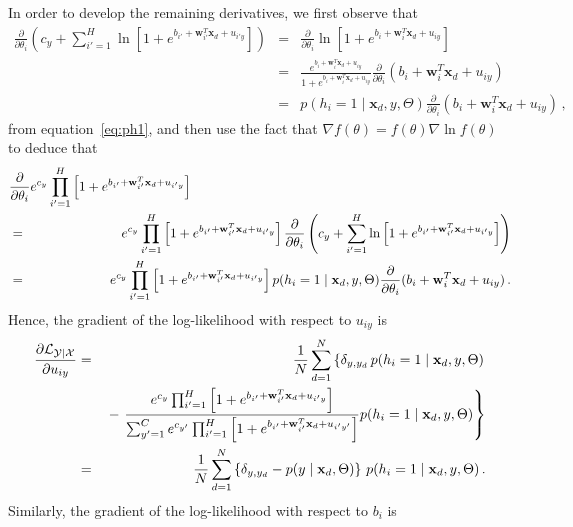\documentclass[a4paper]{article}
\renewcommand{\v}[1]{\mathbf{#1}}
\renewcommand{\c}[1]{{\cal #1}}
\begin{document}
In order to develop the remaining derivatives, we first observe that
\begin{eqnarray}
\frac{\partial}{\partial\theta_i}\left(
c_{y}+\sum_{i'=1}^{H}\ln\left[1+e^{b_{i'}+ \v{w}_{i'}^T\v{x}_d+u_{i'y}}\right]
\right)
&=&
\frac{\partial}{\partial\theta_i}\ln\left[1+e^{b_{i}+ \v{w}_{i}^T\v{x}_d+u_{iy}}\right]
\nonumber\\&=&
\frac{e^{b_{i}+ \v{w}_{i}^T\v{x}_d+u_{iy}}}
{1+e^{b_{i}+ \v{w}_{i}^T\v{x}_d+u_{iy}}}
\frac{\partial}{\partial\theta_i}(b_{i}+ \v{w}_{i}^T\v{x}_d+u_{iy})
\nonumber\\&=&
p(h_i=1\;|\;\v{x}_d,y,\Theta)
\frac{\partial}{\partial\theta_i}(b_{i}+ \v{w}_{i}^T\v{x}_d+u_{iy})\,,
\end{eqnarray}
from equation~\eqref{eq:ph1},
and then use the fact that 
$\nabla f(\theta)=f(\theta)\nabla\ln f(\theta)$ to deduce that
\begin{eqnarray}
&\frac{\partial}{\partial\theta_i}e^{c_{y}}\prod_{i'=1}^{H}\left[1+e^{b_{i'}+ \v{w}_{i'}^T\v{x}_d+u_{i'y}}\right]&
\nonumber\\&=&\hspace*{-25mm}
e^{c_{y}}\prod_{i'=1}^{H}\left[1+e^{b_{i'}+ \v{w}_{i'}^T\v{x}_d+u_{i'y}}\right]
\frac{\partial}{\partial\theta_i}\left(
c_{y}+\sum_{i'=1}^{H}\ln\left[1+e^{b_{i'}+ \v{w}_{i'}^T\v{x}_d+u_{i'y}}\right]
\right)
\nonumber\\&=&\hspace*{-25mm}
e^{c_{y}}\prod_{i'=1}^{H}\left[1+e^{b_{i'}+ \v{w}_{i'}^T\v{x}_d+u_{i'y}}\right]
p(h_i=1\;|\;\v{x}_d,y,\Theta)
\frac{\partial}{\partial\theta_i}(b_{i}+ \v{w}_{i}^T\v{x}_d+u_{iy})\,.
\end{eqnarray}
Hence, the gradient of the log-likelihood with respect to $u_{iy}$ is
\begin{eqnarray}
\frac{\partial\c{L}_{\c{Y}|\c{X}}}{\partial u_{iy}}
& = & 
\frac{1}{N}\sum_{d=1}^N\left\{
\delta_{y,y_d}\,p(h_i=1\;|\;\v{x}_d,y,\Theta)\right.
\nonumber\\&&
{}-\left.\frac{e^{c_{y}}\prod_{i'=1}^{H}\left[1+e^{b_{i'}+ \v{w}_{i'}^T\v{x}_d+u_{i'y}}\right]}
{\sum_{y'=1}^{C}e^{c_{y'}}\prod_{i'=1}^{H}\left[1+e^{b_{i'}+ \v{w}_{i'}^T\v{x}_d+u_{i'y'}}\right]}
p(h_i=1\;|\;\v{x}_d,y,\Theta)
\right\}
\nonumber\\&=&
\frac{1}{N}\sum_{d=1}^N\left\{
\delta_{y,y_d}-p(y\;|\;\v{x}_d,\Theta)\right\}\,p(h_i=1\;|\;\v{x}_d,y,\Theta)
\,.
\end{eqnarray}
Similarly, the gradient of the log-likelihood with respect to $b_{i}$ is
\end{document}
